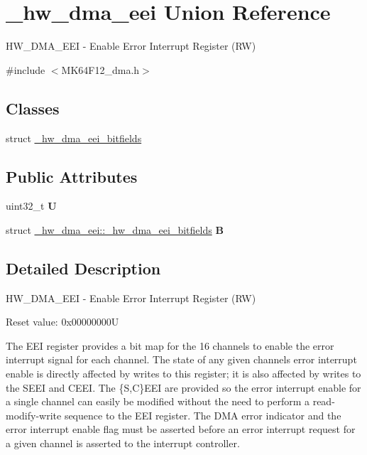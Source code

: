 \hypertarget{union__hw__dma__eei}{}\section{\+\_\+hw\+\_\+dma\+\_\+eei Union Reference}
\label{union__hw__dma__eei}


H\+W\+\_\+\+D\+M\+A\+\_\+\+E\+EI -\/ Enable Error Interrupt Register (RW)  




{\ttfamily \#include $<$M\+K64\+F12\+\_\+dma.\+h$>$}

\subsection*{Classes}
\begin{DoxyCompactItemize}
\item 
struct \hyperlink{struct__hw__dma__eei_1_1__hw__dma__eei__bitfields}{\+\_\+hw\+\_\+dma\+\_\+eei\+\_\+bitfields}
\end{DoxyCompactItemize}
\subsection*{Public Attributes}
\begin{DoxyCompactItemize}
\item 
uint32\+\_\+t {\bfseries U}\hypertarget{union__hw__dma__eei_a16b3e3ad1e396fe16b839534fa843ebc}{}\label{union__hw__dma__eei_a16b3e3ad1e396fe16b839534fa843ebc}

\item 
struct \hyperlink{struct__hw__dma__eei_1_1__hw__dma__eei__bitfields}{\+\_\+hw\+\_\+dma\+\_\+eei\+::\+\_\+hw\+\_\+dma\+\_\+eei\+\_\+bitfields} {\bfseries B}\hypertarget{union__hw__dma__eei_a4fc3db033d001fc2fda647a4521eef9a}{}\label{union__hw__dma__eei_a4fc3db033d001fc2fda647a4521eef9a}

\end{DoxyCompactItemize}


\subsection{Detailed Description}
H\+W\+\_\+\+D\+M\+A\+\_\+\+E\+EI -\/ Enable Error Interrupt Register (RW) 

Reset value\+: 0x00000000U

The E\+EI register provides a bit map for the 16 channels to enable the error interrupt signal for each channel. The state of any given channel\textquotesingle{}s error interrupt enable is directly affected by writes to this register; it is also affected by writes to the S\+E\+EI and C\+E\+EI. The \{S,C\}E\+EI are provided so the error interrupt enable for a single channel can easily be modified without the need to perform a read-\/modify-\/write sequence to the E\+EI register. The D\+MA error indicator and the error interrupt enable flag must be asserted before an error interrupt request for a given channel is asserted to the interrupt controller. 

